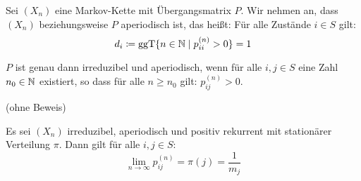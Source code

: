 \documentclass[a4paper,twoside,DIV15,BCOR12mm]{scrbook}
\begin{document}
Sei $(X_n)$ eine Markov-Kette mit Übergangsmatrix $P$. Wir nehmen an, dass $(X_n)$ beziehungsweise $P$ aperiodisch ist, das heißt: Für alle Zustände $i\in S$ gilt: 
\[
d_i \da \operatorname{ggT}\{n\in \MdN \mid p_{ii}^{(n)}>0 \} = 1
\]

\begin{lemma}
\label{lem4.1}
$P$ ist genau dann irreduzibel und aperiodisch, wenn für alle $i,j\in S$ eine Zahl $n_0\in\mathbb{N}$ existiert, so dass für alle $n\ge n_0$ gilt: $p_{ij}^{(n)}>0$.
\end{lemma}

(ohne Beweis)

\begin{satz}[Konvergenzzatz]
Es sei $(X_n)$ irreduzibel, aperiodisch und positiv rekurrent mit stationärer Verteilung $\pi$. Dann gilt für alle $i,j\in S$:
\[
\lim_{n\to\infty} p_{ij}^{(n)} = \pi(j) = \frac1{m_j}
\]
\end{satz}
\end{document}
